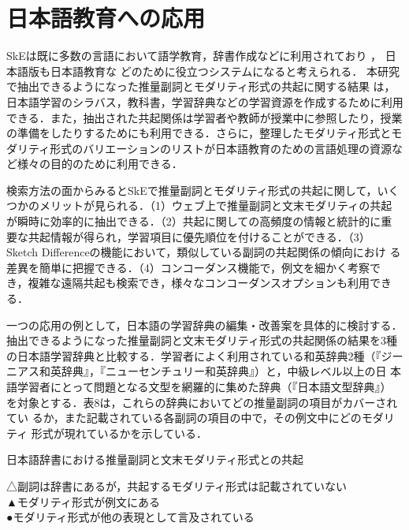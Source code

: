 \documentclass[japanese]{jnlp_1.4}
\begin{document}
\section{日本語教育への応用}

SkEは既に多数の言語において語学教育，辞書作成などに利用されており
    ，
日本語版も日本語教育な
どのために役立つシステムになると考えられる\cite{Srdanovic2008d}．
本研究で抽出できるようになった推量副詞とモダリティ形式の共起に関する結果
は，日本語学習のシラバス，教科書，学習辞典などの学習資源を作成するために利用
できる．また，抽出された共起関係は学習者や教師が授業中に参照したり，授業
の準備をしたりするためにも利用できる．さらに，整理したモダリティ形式とモ
ダリティ形式のバリエーションのリストが日本語教育のための言語処理の資源な
ど様々の目的のために利用できる．

検索方法の面からみるとSkEで推量副詞とモダリティ形式の共起に関して，いく
つかのメリットが見られる．（1）ウェブ上で推量副詞と文末モダリティの共起
が瞬時に効率的に抽出できる．（2）共起に関しての高頻度の情報と統計的に重
要な共起情報が得られ，学習項目に優先順位を付けることができる．（3）
Sketch Differenceの機能において，類似している副詞の共起関係の傾向におけ
る差異を簡単に把握できる．（4）コンコーダンス機能で，例文を細かく考察で
き，複雑な遠隔共起も検索でき，様々なコンコーダンスオプションも利用できる．

一つの応用の例として，日本語の学習辞典の編集・改善案を具体的に検討する．
抽出できるようになった推量副詞と文末モダリティ形式の共起関係の結果を3種
の日本語学習辞典と比較する．学習者によく利用されている和英辞典2種（『ジー
ニアス和英辞典』，『ニューセンチュリー和英辞典』）と，中級レベル以上の日
本語学習者にとって問題となる文型を網羅的に集めた辞典（『日本語文型辞典』）
を対象とする．表8は，これらの辞典においてどの推量副詞の項目がカバーされてい
るか，また記載されている各副詞の項目の中で，その例文中にどのモダリティ
形式が現れているかを示している．

\begin{table}[t]
\caption{日本語辞書における推量副詞と文末モダリティ形式との共起}

\par\vspace{4pt}
\small
△副詞は辞書にあるが，共起するモダリティ形式は記載されていない\\
▲モダリティ形式が例文にある\\
●モダリティ形式が他の表現として言及されている
\end{table}
\end{document}
